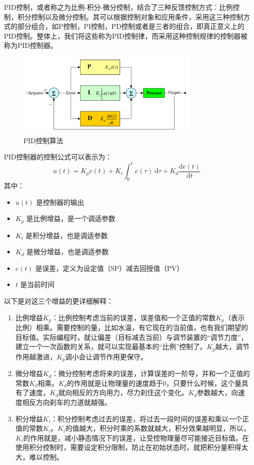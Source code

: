 \documentclass[10pt]{ctexart}
\begin{document}
PID控制，或者称之为比例-积分-微分控制，结合了三种反馈控制方式：比例控制，积分控制以及微分控制。其可以根据控制对象和应用条件，采用这三种控制方式的部分组合，如P控制，PI控制，PD控制或者是三者的组合，即真正意义上的PID控制。整体上，我们将这些称为PID控制律，而采用这种控制规律的控制器被称为PID控制器。

\vfill
\begin{figure}[H]
    \centering
    \includegraphics[width = 0.8\textwidth]{algo/PID.png}
    \caption{PID控制算法}
    \label{fig:PID}
\end{figure}

PID控制器的控制公式可以表示为：
\begin{equation*}
    u(t) = K_p e(t) + K_i \int_0^t e(\tau) \mathrm{~d}\tau + K_d \frac{\mathrm{d} e(t)}{\mathrm{d}t}
\end{equation*}
其中：

\begin{itemize}
    \item $u(t)$ 是控制器的输出
    \item $K_p$ 是比例增益，是一个调适参数
    \item $K_i$ 是积分增益，也是调适参数
    \item $K_d$ 是微分增益，也是调适参数
    \item $e(t)$ 是误差，定义为设定值（SP）减去回授值（PV）
    \item $t$ 是当前时间
\end{itemize}


以下是对这三个增益的更详细解释：

\begin{enumerate}[label = \arabic{*}.]
    \item 比例增益$K_p$：比例控制考虑当前的误差，误差值和一个正值的常数$K_p$（表示比例）相乘。需要控制的量，比如水温，有它现在的当前值，也有我们期望的目标值。实际编程时，就让偏差（目标减去当前）与调节装置的“调节力度”，建立一个一次函数的关系，就可以实现最基本的“比例”控制了。$K_p$越大，调节作用越激进，$K_p$调小会让调节作用更保守。
    \item 微分增益$K_d$：微分控制考虑将来的误差，计算误差的一阶导，并和一个正值的常数$K_d$相乘。$K_d$的作用就是让物理量的速度趋于0，只要什么时候，这个量具有了速度，$K_d$就向相反的方向用力，尽力刹住这个变化。$K_d$参数越大，向速度相反方向刹车的力道就越强。
    \item 积分增益$K_i$：积分控制考虑过去的误差，将过去一段时间的误差和乘以一个正值的常数$K_i$。$K_i$的值越大，积分时乘的系数就越大，积分效果越明显，所以，$K_i$的作用就是，减小静态情况下的误差，让受控物理量尽可能接近目标值。在使用积分控制时，需要设定积分限制，防止在初始状态时，就把积分量积得太大，难以控制。
\end{enumerate}
\end{document}
